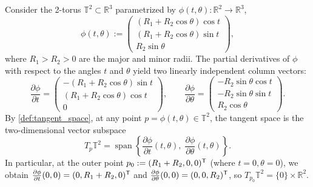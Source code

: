 \begin{example}
\label{ex:torus_tangent_space}
Consider the 2-torus $\mathbb{T}^2 \subset \mathbb{R}^3$ parametrized by $\phi(t,\theta) : \mathbb{R}^2 \to \mathbb{R}^3$,
\[
\phi(t,\theta) := \begin{pmatrix} (R_1 + R_2 \cos\theta)\cos t \\ (R_1 + R_2 \cos\theta)\sin t \\ R_2 \sin\theta \end{pmatrix},
\]
where $R_1 > R_2 > 0$ are the major and minor radii. The partial derivatives of $\phi$ with respect to the angles $t$ and $\theta$ yield two linearly independent column vectors:
\[
\frac{\partial \phi}{\partial t} = \begin{pmatrix} -(R_1 + R_2\cos\theta)\sin t \\ (R_1 + R_2\cos\theta)\cos t \\ 0 \end{pmatrix}, \qquad
\frac{\partial \phi}{\partial \theta} = \begin{pmatrix} -R_2\sin\theta\cos t \\ -R_2\sin\theta\sin t \\ R_2\cos\theta \end{pmatrix}.
\]
By \cref{def:tangent_space}, at any point $p = \phi(t,\theta) \in \mathbb{T}^2$, the tangent space is the two-dimensional vector subspace
\[
T_p \mathbb{T}^2 = \operatorname{span}\left\{ \frac{\partial \phi}{\partial t}(t,\theta), \; \frac{\partial \phi}{\partial \theta}(t,\theta) \right\}.
\]
In particular, at the outer point $p_0 := (R_1+R_2, 0, 0)^{\mathsf{T}}$ (where $t = 0, \theta = 0$), we obtain $\frac{\partial \phi}{\partial t}(0,0) = (0, R_1+R_2, 0)^{\mathsf{T}}$ and $\frac{\partial \phi}{\partial \theta}(0,0) = (0, 0, R_2)^{\mathsf{T}}$, so $T_{p_0}\mathbb{T}^2 = \{0\} \times \mathbb{R}^2$.
\end{example}

